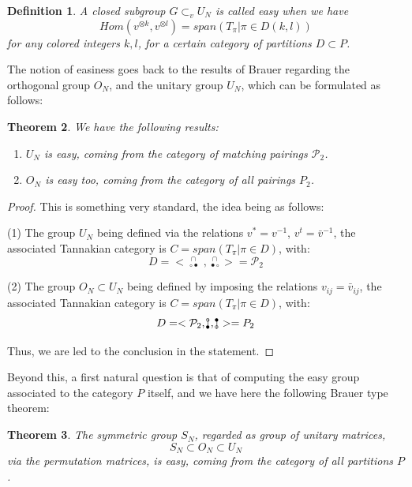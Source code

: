 \documentclass[12pt]{amsbook}
\newtheorem{theorem}{Theorem}[chapter]
\newtheorem{definition}[theorem]{Definition}
\begin{document}
\begin{definition}
A closed subgroup $G\subset_vU_N$ is called easy when we have
$$Hom(v^{\otimes k},v^{\otimes l})=span\left(T_\pi\Big|\pi\in D(k,l)\right)$$
for any colored integers $k,l$, for a certain category of partitions $D\subset P$.
\end{definition}

The notion of easiness goes back to the results of Brauer regarding the orthogonal group $O_N$, and the unitary group $U_N$, which can be formulated as follows:


\begin{theorem}
We have the following results:
\begin{enumerate}
\item $U_N$ is easy, coming from the category of matching pairings $\mathcal P_2$.

\item $O_N$ is easy too, coming from the category of all pairings $P_2$.
\end{enumerate}
\end{theorem}

\begin{proof}
This is something very standard, the idea being as follows:

\medskip

(1) The group $U_N$ being defined via the relations $v^*=v^{-1}$, $v^t=\bar{v}^{-1}$, the associated Tannakian category is $C=span(T_\pi|\pi\in D)$, with:
$$D
=<{\ }^{\,\cap}_{\circ\bullet}\,\,,{\ }^{\,\cap}_{\bullet\circ}>
=\mathcal P_2$$

(2) The group $O_N\subset U_N$ being defined by imposing the relations $v_{ij}=\bar{v}_{ij}$, the associated Tannakian category is $C=span(T_\pi|\pi\in D)$, with:
$$D
=<\mathcal P_2,|^{\hskip-1.32mm\circ}_{\hskip-1.32mm\bullet},|_{\hskip-1.32mm\circ}^{\hskip-1.32mm\bullet}>
=P_2$$
  
Thus, we are led to the conclusion in the statement.
\end{proof}

Beyond this, a first natural question is that of computing the easy group associated to the category $P$ itself, and we have here the following Brauer type theorem:


\begin{theorem}
The symmetric group $S_N$, regarded as group of unitary matrices,
$$S_N\subset O_N\subset U_N$$
via the permutation matrices, is easy, coming from the category of all partitions $P$.
\end{theorem}
\end{document}
